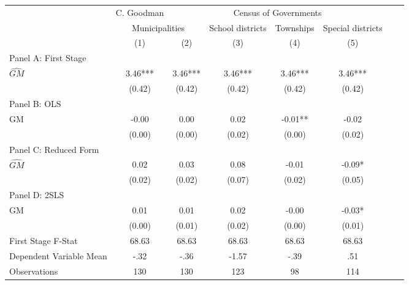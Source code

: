  \begin{tabular}{l*{7}{c}} \toprule
&\multicolumn{1}{c}{C. Goodman}&\multicolumn{4}{c}{Census of Governments}\\\cmidrule(lr){2-2}\cmidrule(lr){3-6}
&\multicolumn{2}{c}{Municipalities}&\multicolumn{1}{c}{School districts}&\multicolumn{1}{c}{Townships}&\multicolumn{1}{c}{Special districts}\\\cmidrule(lr){2-3}\cmidrule(lr){4-6}
&\multicolumn{1}{c}{(1)}&\multicolumn{1}{c}{(2)}&\multicolumn{1}{c}{(3)}&\multicolumn{1}{c}{(4)}&\multicolumn{1}{c}{(5)}\\
\cmidrule(lr){1-6}
\multicolumn{5}{l}{Panel A: First Stage}\\
\cmidrule(lr){1-6}
$\widehat{GM}$  &     3.46***&     3.46***&     3.46***&     3.46***&     3.46***\\
                &   (0.42)   &   (0.42)   &   (0.42)   &   (0.42)   &   (0.42)   \\
\cmidrule(lr){1-6}
\multicolumn{5}{l}{Panel B: OLS}\\
\cmidrule(lr){1-6}
GM              &    -0.00   &     0.00   &     0.02   &    -0.01** &    -0.02   \\
                &   (0.00)   &   (0.00)   &   (0.02)   &   (0.00)   &   (0.02)   \\
\cmidrule(lr){1-6}
\multicolumn{5}{l}{Panel C: Reduced Form}\\
\cmidrule(lr){1-6}
$\widehat{GM}$  &     0.02   &     0.03   &     0.08   &    -0.01   &    -0.09*  \\
                &   (0.02)   &   (0.02)   &   (0.07)   &   (0.02)   &   (0.05)   \\
\cmidrule(lr){1-6}
\multicolumn{5}{l}{Panel D: 2SLS}\\
\cmidrule(lr){1-6}
GM              &     0.01   &     0.01   &     0.02   &    -0.00   &    -0.03*  \\
                &   (0.00)   &   (0.01)   &   (0.02)   &   (0.00)   &   (0.01)   \\
\midrule
First Stage F-Stat&    68.63   &    68.63   &    68.63   &    68.63   &    68.63   \\
Dependent Variable Mean&     -.32   &     -.36   &    -1.57   &     -.39   &      .51   \\
Observations    &      130   &      130   &      123   &       98   &      114   \\
       \bottomrule \end{tabular}
